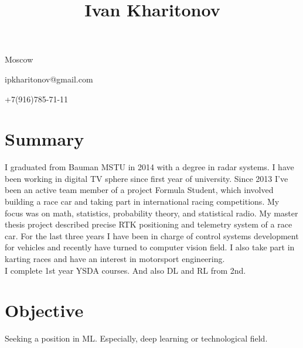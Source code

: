 \documentclass[10pt]{article}
\title{\bfseries\Huge Ivan Kharitonov}
\author{}
\date{}
\begin{document}
\maketitle
\vspace{-\topsep}
\vspace{-\topsep}
\vspace{-\topsep}
\vspace{-\topsep}
\vspace{-\topsep}
\vspace{-\topsep}
\vspace{-\topsep}
\vspace{-\topsep}

\begin{minipage}[ht]{0.35\textwidth}
Moscow
\end{minipage}
\begin{minipage}[ht]{0.35\textwidth}
ipkharitonov@gmail.com
\end{minipage}
\begin{minipage}[ht]{0.35\textwidth}
+7(916)785-71-11
\end{minipage}
\vspace{-\topsep}
\vspace{-\topsep}
\section*{Summary}
\footnotesize 
\vspace{-\topsep}
I graduated from Bauman MSTU in 2014 with a degree in radar systems.  
I have been working in digital TV sphere since first year of university. Since 2013 I've been an active team member of a project Formula Student, which involved building a race car and taking part in international racing competitions. 
My focus was on math, statistics, probability theory, and statistical radio. My master thesis project described precise RTK positioning and telemetry system of a race car. For the last three years I have been in charge of control systems development for vehicles and recently have turned to computer vision field. I also take part in karting races and have an interest in motorsport engineering.
\\
I complete 1st year YSDA courses. And also DL and RL from 2nd. 

\section*{Objective}
\footnotesize 
\vspace{-\topsep}
Seeking a position in ML. Especially, deep learning or technological field. 
 \vspace{-\topsep}
 
\end{document}
